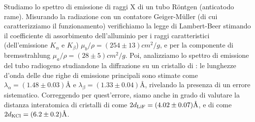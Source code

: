 Studiamo lo spettro di emissione di raggi X di un tubo Röntgen (anticatodo rame).
Misurando la radiazione con un contatore Geiger-Müller (di cui caratterizziamo il funzionamento) verifichiamo la legge di Lambert-Beer stimando il coefficiente di assorbimento dell'alluminio per i raggi caratteristici (dell'emissione $ K_\alpha $ e $ K_\beta $) $ \mu_b / \rho  = (254 \pm 13 ) \unit{cm^2 / g} $, e per la componente di bremsstrahlung $ \mu_a / \rho = (28 \pm 5) \unit{cm^2 / g} $. 
Poi, analizziamo lo spettro di emissione del tubo radiogeno studiandone la diffrazione su un cristallo di : le lunghezze d'onda delle due righe di emissione principali sono stimate come $ \lambda_\alpha = (1.48 \pm 0.03) \unit{\angstrom} $ e $ \lambda_\beta = (1.33 \pm 0.04) \unit{\angstrom} $, rivelando la presenza di un errore sistematico.
Correggendo per quest'errore, siamo anche in grado di valutare la distanza interatomica di cristalli di  come $ 2d_{\ce{LiF}} = (4.02 \pm 0.07) \unit{\angstrom} $, e di  come $ 2d_{\ce{KCl}} = (6.2 \pm 0.2) \unit{\angstrom} $.
